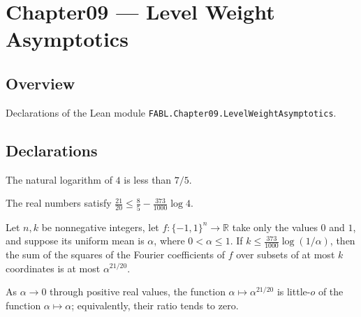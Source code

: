\chapter{Chapter09 — Level Weight Asymptotics}
\section{Overview}

Declarations of the Lean module \texttt{FABL.Chapter09.LevelWeightAsymptotics}.

\section{Declarations}

\begin{theorem}
\label{FABL.log_four_lt_seven_fifths}
\leanok
{}
The natural logarithm of $4$ is less than $7/5$.
\end{theorem}

\begin{theorem}
\label{FABL.exercise9_19_exponent_bound}
\leanok
{}
The real numbers satisfy $\frac{21}{20} \le \frac{8}{5}-\frac{373}{1000}\log 4$.
\end{theorem}

\begin{theorem}
\label{FABL.exercise9_19_quantitative}
\leanok
{}
Let $n,k$ be nonnegative integers, let $f:\{-1,1\}^n\to\mathbb R$ take only the values
$0$ and $1$, and suppose its uniform mean is $\alpha$, where $0<\alpha\le 1$. If $k\le
\frac{373}{1000}\log(1/\alpha)$, then the sum of the squares of the Fourier coefficients
of $f$ over subsets of at most $k$ coordinates is at most $\alpha^{21/20}$.
\end{theorem}

\begin{theorem}
\label{FABL.rpow_twentyone_twentieth_isLittleO}
\leanok
{}
As $\alpha\to0$ through positive real values, the function $\alpha\mapsto\alpha^{21/20}$
is little-$o$ of the function $\alpha\mapsto\alpha$; equivalently, their ratio tends to
zero.
\end{theorem}

